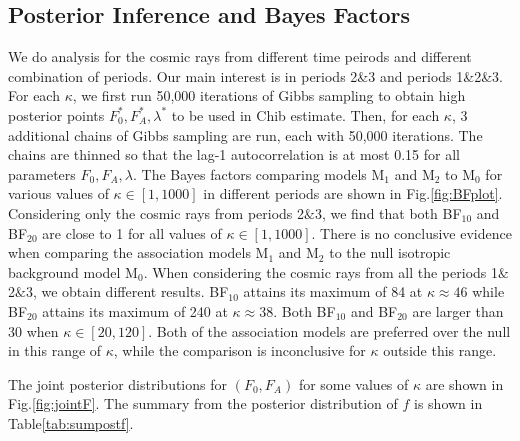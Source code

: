 \documentclass[dvips,aoas]{imsart}
\begin{document}
\subsection{Posterior Inference and Bayes Factors}
We do analysis for the cosmic rays from different time peirods and different 
combination of periods. Our main interest is in periods 2\&3 and periods 
1\&2\&3. For each $\kappa$, we first run 50,000 iterations of Gibbs 
sampling to obtain high posterior points $F_0^*, F_A^*, \lambda^*$ 
to be used in Chib estimate. Then, for each $\kappa$, 3 additional 
chains of Gibbs sampling are run, each with 50,000 iterations. 
The chains are thinned so that the lag-1 autocorrelation is at 
most 0.15 for all parameters $F_0, F_A, \lambda$. The Bayes 
factors comparing models M$_1$ and M$_2$ to M$_0$ for
various values of $\kappa\in[1,1000]$ in different periods are 
shown in Fig.\ref{fig:BFplot}. Considering only the cosmic rays 
from periods 2$\&3$, we find that both BF$_{10}$ and BF$_{20}$
are close to 1 for all values of $\kappa\in[1,1000]$. There is no 
conclusive evidence when comparing the association models 
M$_1$ and M$_2$ to the null isotropic background model M$_0$.
When considering the cosmic rays from all the periods 1$\&$2$\&$3, 
we obtain different results. BF$_{10}$ attains its maximum 
of 84 at $\kappa\approx 46$ while BF$_{20}$ attains its maximum of 
240 at $\kappa\approx 38$. Both BF$_{10}$ and BF$_{20}$ are 
larger than 30 when $\kappa\in[20,120]$. Both of the association 
models are preferred over the null in this range of $\kappa$, 
while the comparison is inconclusive for $\kappa$ outside this range.

The joint posterior distributions for $(F_0,F_A)$ for some values 
of $\kappa$ are shown in Fig.\ref{fig:jointF}. The summary from 
the posterior distribution of $f$ is shown in Table\ref{tab:sumpostf}.
\end{document}
